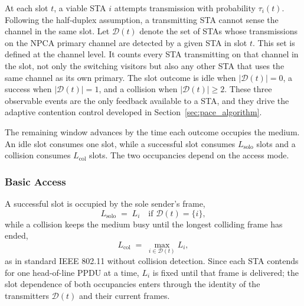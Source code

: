 \documentclass[conference]{IEEEtran}
\begin{document}
At each slot $t$, a viable STA $i$ attempts transmission with probability $\tau_i(t)$. Following the half-duplex assumption, a transmitting STA cannot sense the channel in the same slot. Let $\mathcal{D}(t)$ denote the set of STAs whose transmissions on the NPCA primary channel are detected by a given STA in slot $t$. This set is defined at the channel level. It counts every STA transmitting on that channel in the slot, not only the switching visitors but also any other STA that uses the same channel as its own primary. The slot outcome is idle when $|\mathcal{D}(t)|=0$, a success when $|\mathcal{D}(t)|=1$, and a collision when $|\mathcal{D}(t)|\ge 2$. These three observable events are the only feedback available to a STA, and they drive the adaptive contention control developed in Section~\ref{sec:pace_algorithm}.

The remaining window advances by the time each outcome occupies the medium. An idle slot consumes one slot, while a successful slot consumes $L_\mathrm{solo}$ slots and a collision consumes $L_\mathrm{col}$ slots. The two occupancies depend on the access mode.

\subsubsection{Basic Access}
A successful slot is occupied by the sole sender's frame,
\begin{equation}
    L_\mathrm{solo} \;=\; L_i \quad \text{if } \mathcal{D}(t)=\{i\},
    \label{eq:lsolo_basic}
\end{equation}
while a collision keeps the medium busy until the longest colliding frame has ended,
\begin{equation}
    L_\mathrm{col} \;=\; \max_{i\in\mathcal{D}(t)} L_i,
    \label{eq:lmax}
\end{equation}
as in standard IEEE 802.11 without collision detection. Since each STA contends for one head-of-line PPDU at a time, $L_i$ is fixed until that frame is delivered; the slot dependence of both occupancies enters through the identity of the transmitters $\mathcal{D}(t)$ and their current frames.
\end{document}
